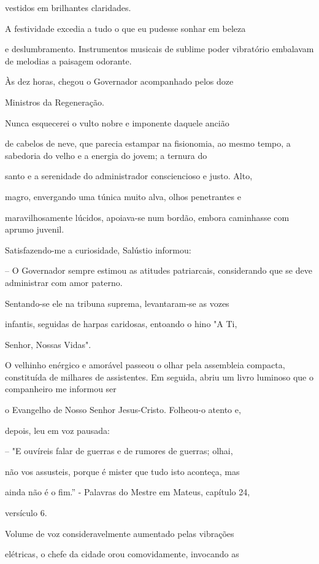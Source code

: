 \documentclass[portuguese,12pt,a4paper]{scrbook}
\begin{document}
	vestidos em brilhantes claridades.
	
	A festividade excedia a tudo o que eu pudesse sonhar em beleza
	
	e deslumbramento. Instrumentos musicais de sublime poder vibratório embalavam de melodias a paisagem odorante.
	
	Às dez horas, chegou o Governador acompanhado pelos doze
	
	Ministros da Regeneração.
	
	Nunca esquecerei o vulto nobre e imponente daquele ancião
	
	de cabelos de neve, que parecia estampar na fisionomia, ao mesmo tempo, a sabedoria do velho e a energia do jovem; a ternura do
	
	santo e a serenidade do administrador consciencioso e justo. Alto,
	
	
	magro, envergando uma túnica muito alva, olhos penetrantes e
	
	maravilhosamente lúcidos, apoiava-se num bordão, embora caminhasse com aprumo juvenil.
	
	Satisfazendo-me a curiosidade, Salústio informou:
	
	– O Governador sempre estimou as atitudes patriarcais, considerando que se deve administrar com amor paterno.
	
	Sentando-se ele na tribuna suprema, levantaram-se as vozes
	
	infantis, seguidas de harpas caridosas, entoando o hino "A Ti,
	
	Senhor, Nossas Vidas".
	
	O velhinho enérgico e amorável passeou o olhar pela assembleia compacta, constituída de milhares de assistentes. Em seguida, abriu um livro luminoso que o companheiro me informou ser
	
	o Evangelho de Nosso Senhor Jesus-Cristo. Folheou-o atento e,
	
	depois, leu em voz pausada:
	
	– "E ouvíreis falar de guerras e de rumores de guerras; olhai,
	
	não vos assusteis, porque é mister que tudo isto aconteça, mas
	
	ainda não é o fim.” - Palavras do Mestre em Mateus, capítulo 24,
	
	versículo 6.
	
	Volume de voz consideravelmente aumentado pelas vibrações
	
	elétricas, o chefe da cidade orou comovidamente, invocando as
	
\end{document}
